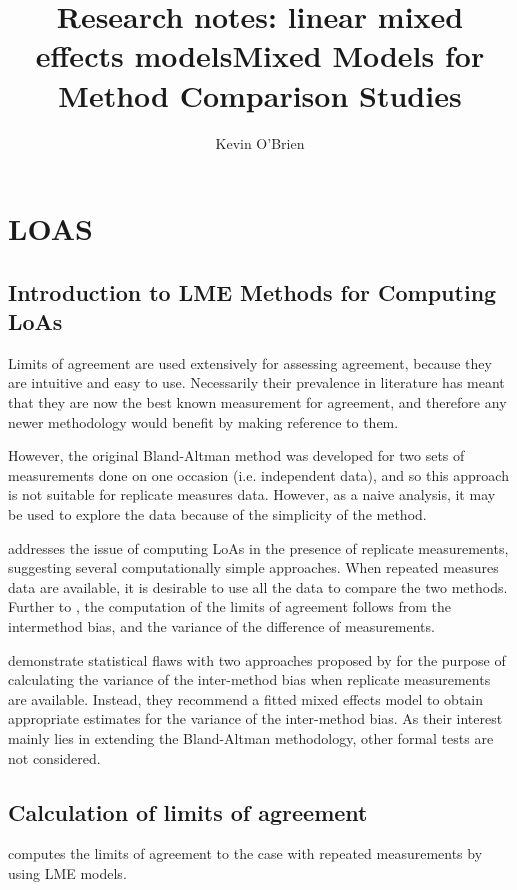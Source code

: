 \documentclass[12pt, a4paper]{report}
\title{Research notes: linear mixed effects models}
\author{ } \date{ }
\theoremstyle{plain}
\theoremstyle{definition}
\theoremstyle{remark}
\begin{document}
\author{Kevin O'Brien}
\title{Mixed Models for Method Comparison Studies}
\tableofcontents

\chapter{LOAS}

\section{Introduction to LME Methods for Computing LoAs}


Limits of agreement are used extensively for assessing agreement, because they are intuitive and easy to use.
Necessarily their prevalence in literature has meant that they are now the best known measurement for agreement, and therefore any newer methodology would benefit by making reference to them.

However, the original Bland-Altman method was developed for two sets of measurements done on one occasion (i.e. independent data), and so this approach is not suitable for replicate measures data. However, as a naive analysis, it may be used to explore the data because of the simplicity of the method.

\citet{BA99} addresses the issue of computing LoAs in the presence of replicate measurements, suggesting several computationally simple approaches. When repeated measures data are available, it is desirable to use all the data to compare the two methods. 
Further to \citet{BA86}, the computation of the limits of agreement follows from the intermethod bias, and the variance of the difference of measurements. 

\citet{BXC2008} demonstrate statistical flaws with two approaches proposed by \citet{BA99} for the purpose of calculating the variance of the inter-method bias when replicate measurements are available. Instead, they recommend a fitted mixed effects model to obtain appropriate estimates for the variance of the inter-method bias. As their interest mainly lies in extending the Bland-Altman methodology, other formal tests are not considered.


\section{Calculation of limits of agreement }

\citet{BXC2008} computes the limits of agreement to the case with repeated measurements by using LME models.
\end{document}
